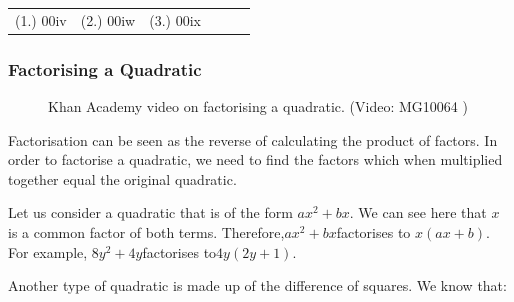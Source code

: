   \label{m39383**end}
\practiceinfo
\par 
 \par \begin{tabular}[h]{cccccc}
 (1.) 00iv&  (2.) 00iw&  (3.) 00ix& \end{tabular}
    \label{m39394*cid5}
            \subsubsection{ Factorising a Quadratic}
            \nopagebreak
      \label{m39394*eip-218}
    \setcounter{subfigure}{0}
	\begin{figure}[H] %
    \textnormal{Khan Academy video on factorising a quadratic.}\vspace{.1in} \nopagebreak
  \label{m39394*yt-media2}\label{m39394*yt-video2}
             { (Video:  MG10064 )}
      \vspace{2pt}
    \vspace{.1in}
 \end{figure}       \par \label{m39394*eip-411}Factorisation can be seen as the reverse of calculating the product of factors. In order to factorise a quadratic, we need to find the factors which when multiplied together equal the original quadratic.\par 
      \label{m39394*id275057}Let us consider a quadratic that is of the form $a{x}^{2}+bx$\hspace{1ex}. We can see here that $x$ is a common factor of both terms. Therefore,\hspace{1ex}$a{x}^{2}+bx$\hspace{1ex}factorises to $x\left(ax+b\right)$. For example, $8{y}^{2}+4y$\hspace{1ex}factorises to\hspace{1ex}$4y\left(2y+1\right)$.\par 
      \label{m39394*id275188}Another type of quadratic is made up of the difference of squares. We know that:\par 
      \label{m39394*id275192}\nopagebreak\noindent{}
